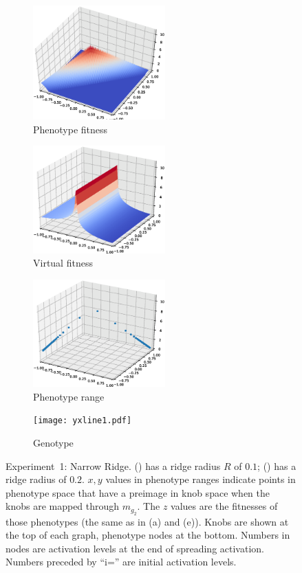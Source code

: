 \documentclass[letterpaper]{article}
\begin{document}
\begin{figure}[t]
   \begin{subfigure}[b]{0.2\textwidth}
   \includegraphics[width=2in]{yxline1-phfunc.eps}
   \caption{Phenotype fitness}
   \label{yxline1-phfunc}
   \end{subfigure}
   \begin{subfigure}[b]{0.2\textwidth}
   \includegraphics[width=2in]{yxline1-vfunc.eps}
   \caption{Virtual fitness}
   \label{yxline1-vfunc}
   \end{subfigure}
   \begin{subfigure}[b]{0.2\textwidth}
   \includegraphics[width=2in]{yxline1-phrange.eps}
   \caption{Phenotype range}
   \label{yxline1-phrange}
   \end{subfigure}
   \begin{subfigure}[b]{0.2\textwidth}
   \texttt{[image: yxline1.pdf]}
   \caption{Genotype}
   \label{yxline1-genotype}
   \end{subfigure}


   \caption{Experiment~1: Narrow Ridge. () has a
   ridge radius $R$ of $0.1$; () has a ridge radius
   of $0.2$. $x,y$ values in phenotype ranges indicate points in phenotype
   space that have a preimage in knob space when the knobs are mapped through
   $m_{g_2}$. The $z$ values are the fitnesses of those phenotypes (the same
   as in (a) and (e)). Knobs are shown at the top of each graph, phenotype
nodes at the bottom. Numbers in nodes are activation levels at the end of
spreading activation. Numbers preceded by ``i='' are initial activation
levels.}
   \label{fig:narrow-ridge}
\end{figure}
\end{document}
